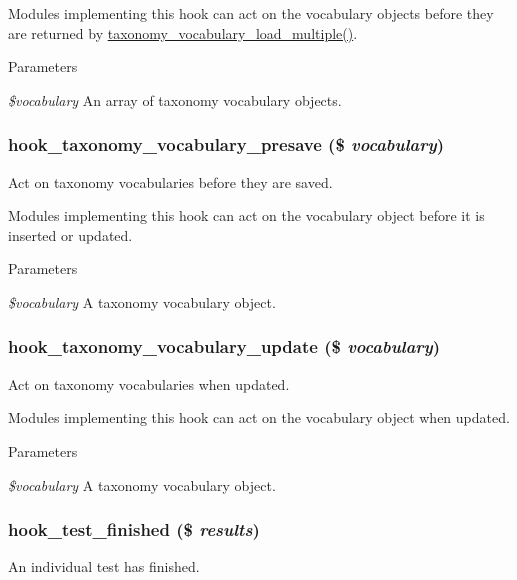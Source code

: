 Modules implementing this hook can act on the vocabulary objects before they are returned by \hyperlink{taxonomy_8module_aedb1343599759686a2701b067b75e1ea}{taxonomy\_\-vocabulary\_\-load\_\-multiple()}.


\begin{DoxyParams}{Parameters}
\item[{\em \$vocabulary}]An array of taxonomy vocabulary objects. \end{DoxyParams}
\hypertarget{group__hooks_ga8ec7aaf710eacd639ce92443139089d0}{
\subsubsection[{hook\_\-taxonomy\_\-vocabulary\_\-presave}]{\setlength{\rightskip}{0pt plus 5cm}hook\_\-taxonomy\_\-vocabulary\_\-presave (\$ {\em vocabulary})}}
\label{group__hooks_ga8ec7aaf710eacd639ce92443139089d0}
Act on taxonomy vocabularies before they are saved.

Modules implementing this hook can act on the vocabulary object before it is inserted or updated.


\begin{DoxyParams}{Parameters}
\item[{\em \$vocabulary}]A taxonomy vocabulary object. \end{DoxyParams}
\hypertarget{group__hooks_gaf7e614327d1d3826d208fd6528df4a70}{
\subsubsection[{hook\_\-taxonomy\_\-vocabulary\_\-update}]{\setlength{\rightskip}{0pt plus 5cm}hook\_\-taxonomy\_\-vocabulary\_\-update (\$ {\em vocabulary})}}
\label{group__hooks_gaf7e614327d1d3826d208fd6528df4a70}
Act on taxonomy vocabularies when updated.

Modules implementing this hook can act on the vocabulary object when updated.


\begin{DoxyParams}{Parameters}
\item[{\em \$vocabulary}]A taxonomy vocabulary object. \end{DoxyParams}
\hypertarget{group__hooks_gaebaf3196cbd4a76ad40603762443e9c5}{
\subsubsection[{hook\_\-test\_\-finished}]{\setlength{\rightskip}{0pt plus 5cm}hook\_\-test\_\-finished (\$ {\em results})}}
\label{group__hooks_gaebaf3196cbd4a76ad40603762443e9c5}
An individual test has finished.

